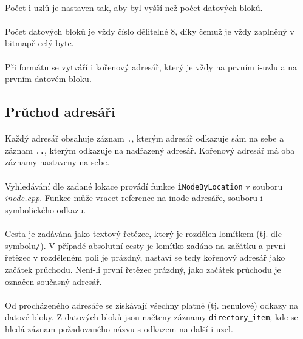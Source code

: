 \documentclass[12pt]{scrartcl}
\begin{document}
\paragraph{}
Počet i-uzlů je nastaven tak, aby byl vyšší než počet datových bloků.
\paragraph{}
Počet datových bloků je vždy číslo dělitelné 8, díky čemuž je vždy zaplněný v bitmapě celý byte.
\paragraph{}
Při formátu se vytváří i kořenový adresář, který je vždy na prvním i-uzlu a na prvním datovém bloku.

\subsection{Průchod adresáři}
\paragraph{}
Každý adresář obsahuje záznam \texttt{.}, kterým adresář odkazuje sám na sebe a záznam \texttt{..}, kterým odkazuje na nadřazený adresář. Kořenový adresář má oba záznamy nastaveny na sebe.
\paragraph{}
Vyhledávání dle zadané lokace provádí funkce \texttt{iNodeByLocation} v souboru \textit{inode.cpp}. Funkce může vracet reference na inode adresáře, souboru i symbolického odkazu.
\paragraph{}
Cesta je zadávána jako textový řetězec, který je rozdělen lomítkem (tj. dle symbolu\nobreakspace \texttt{/}). V případě absolutní cesty je lomítko zadáno na začátku a první řetězec v rozděleném poli je prázdný, nastaví se tedy kořenový adresář jako začátek průchodu. Není-li první řetězec prázdný, jako začátek průchodu je označen současný adresář.
\paragraph{}
Od procházeného adresáře se získávají všechny platné (tj. nenulové) odkazy na datové bloky. Z datových bloků jsou načteny záznamy \texttt{{directory\_item}}, kde se hledá záznam požadovaného názvu s odkazem na další i-uzel.
\end{document}
